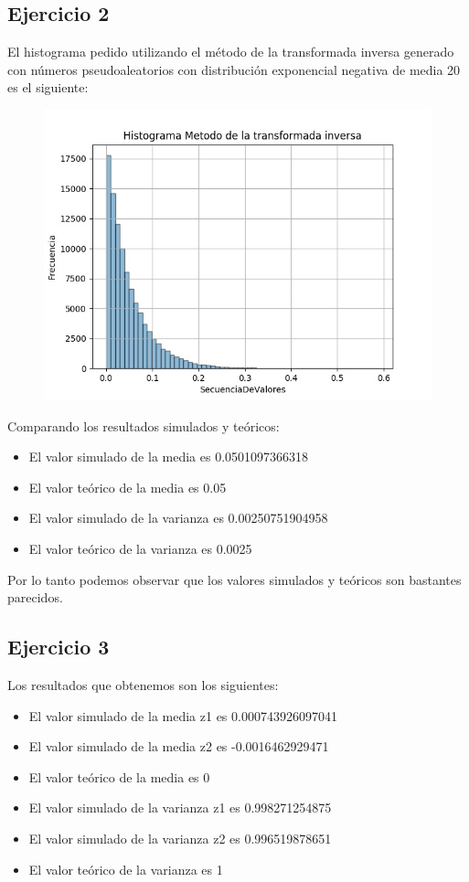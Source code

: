 \documentclass[11pt,a4paper]{article}
\begin{document}
	\subsection{Ejercicio 2}
		El histograma pedido utilizando el método de la transformada inversa generado con números pseudoaleatorios con distribución exponencial negativa de media 20 es el siguiente:
		\begin{figure}[H]
  			\centering
    			\includegraphics[width=14cm]{imagenes/histogramaEjer2}
		\end{figure}
		Comparando los resultados simulados y teóricos:
		\begin{itemize}
			\item El valor simulado de la media es 0.0501097366318
			\item El valor teórico de la media es 0.05
			\item El valor simulado de la varianza es 0.00250751904958
			\item El valor teórico de la varianza es 0.0025
		\end{itemize}
		
		Por lo tanto podemos observar que los valores simulados y teóricos son bastantes parecidos.

	\subsection{Ejercicio 3}

		Los resultados que obtenemos son los siguientes:
		\begin{itemize}
			\item El valor simulado de la media z1 es 0.000743926097041
			\item El valor simulado de la media z2 es -0.0016462929471
			\item El valor teórico de la media es 0 
			\item El valor simulado de la varianza z1 es 0.998271254875
			\item El valor simulado de la varianza z2 es 0.996519878651
			\item El valor teórico de la varianza es 1
		\end{itemize}
\end{document}
